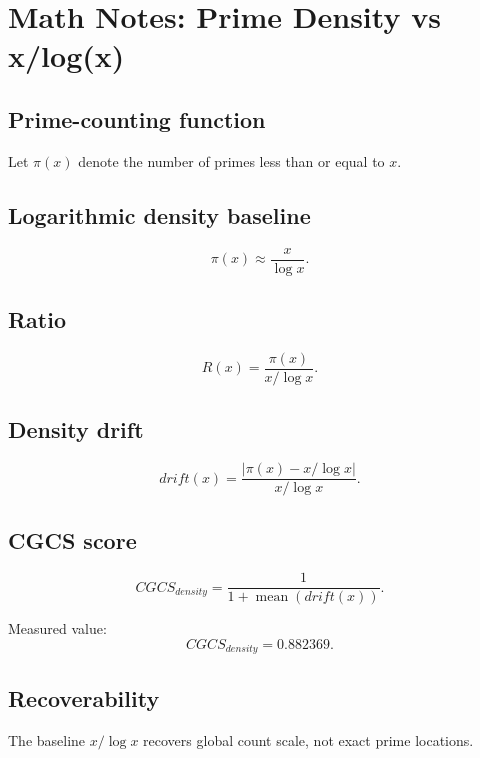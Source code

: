 \documentclass{article}
\begin{document}
\section*{Math Notes: Prime Density vs x/log(x)}

\subsection*{Prime-counting function}

Let $\pi(x)$ denote the number of primes less than or equal to $x$.

\subsection*{Logarithmic density baseline}

\[
\pi(x) \approx \frac{x}{\log x}.
\]

\subsection*{Ratio}

\[
R(x) = \frac{\pi(x)}{x/\log x}.
\]

\subsection*{Density drift}

\[
drift(x) =
\frac{|\pi(x) - x/\log x|}{x/\log x}.
\]

\subsection*{CGCS score}

\[
CGCS_{density} =
\frac{1}{1 + \operatorname{mean}(drift(x))}.
\]

Measured value:
\[
CGCS_{density} = 0.882369.
\]

\subsection*{Recoverability}

The baseline $x/\log x$ recovers global count scale, not exact prime locations.
\end{document}
